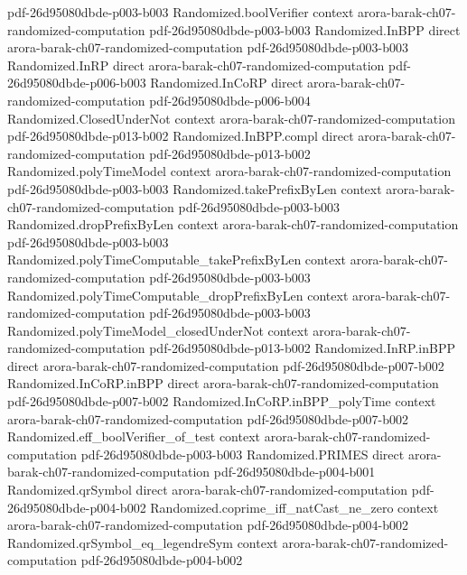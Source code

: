 \begin{theorem}
  {pdf-26d95080dbde-p003-b003}
\proofstep
  {Randomized.boolVerifier}
  {context}
  {arora-barak-ch07-randomized-computation}
  {pdf-26d95080dbde-p003-b003}
\proofstep
  {Randomized.InBPP}
  {direct}
  {arora-barak-ch07-randomized-computation}
  {pdf-26d95080dbde-p003-b003}
\proofstep
  {Randomized.InRP}
  {direct}
  {arora-barak-ch07-randomized-computation}
  {pdf-26d95080dbde-p006-b003}
\proofstep
  {Randomized.InCoRP}
  {direct}
  {arora-barak-ch07-randomized-computation}
  {pdf-26d95080dbde-p006-b004}
\proofstep
  {Randomized.ClosedUnderNot}
  {context}
  {arora-barak-ch07-randomized-computation}
  {pdf-26d95080dbde-p013-b002}
\proofstep
  {Randomized.InBPP.compl}
  {direct}
  {arora-barak-ch07-randomized-computation}
  {pdf-26d95080dbde-p013-b002}
\proofstep
  {Randomized.polyTimeModel}
  {context}
  {arora-barak-ch07-randomized-computation}
  {pdf-26d95080dbde-p003-b003}
\proofstep
  {Randomized.takePrefixByLen}
  {context}
  {arora-barak-ch07-randomized-computation}
  {pdf-26d95080dbde-p003-b003}
\proofstep
  {Randomized.dropPrefixByLen}
  {context}
  {arora-barak-ch07-randomized-computation}
  {pdf-26d95080dbde-p003-b003}
\proofstep
  {Randomized.polyTimeComputable_takePrefixByLen}
  {context}
  {arora-barak-ch07-randomized-computation}
  {pdf-26d95080dbde-p003-b003}
\proofstep
  {Randomized.polyTimeComputable_dropPrefixByLen}
  {context}
  {arora-barak-ch07-randomized-computation}
  {pdf-26d95080dbde-p003-b003}
\proofstep
  {Randomized.polyTimeModel_closedUnderNot}
  {context}
  {arora-barak-ch07-randomized-computation}
  {pdf-26d95080dbde-p013-b002}
\proofstep
  {Randomized.InRP.inBPP}
  {direct}
  {arora-barak-ch07-randomized-computation}
  {pdf-26d95080dbde-p007-b002}
\proofstep
  {Randomized.InCoRP.inBPP}
  {direct}
  {arora-barak-ch07-randomized-computation}
  {pdf-26d95080dbde-p007-b002}
\proofstep
  {Randomized.InCoRP.inBPP_polyTime}
  {context}
  {arora-barak-ch07-randomized-computation}
  {pdf-26d95080dbde-p007-b002}
\proofstep
  {Randomized.eff_boolVerifier_of_test}
  {context}
  {arora-barak-ch07-randomized-computation}
  {pdf-26d95080dbde-p003-b003}
\proofstep
  {Randomized.PRIMES}
  {direct}
  {arora-barak-ch07-randomized-computation}
  {pdf-26d95080dbde-p004-b001}
\proofstep
  {Randomized.qrSymbol}
  {direct}
  {arora-barak-ch07-randomized-computation}
  {pdf-26d95080dbde-p004-b002}
\proofstep
  {Randomized.coprime_iff_natCast_ne_zero}
  {context}
  {arora-barak-ch07-randomized-computation}
  {pdf-26d95080dbde-p004-b002}
\proofstep
  {Randomized.qrSymbol_eq_legendreSym}
  {context}
  {arora-barak-ch07-randomized-computation}
  {pdf-26d95080dbde-p004-b002}

\end{theorem}
